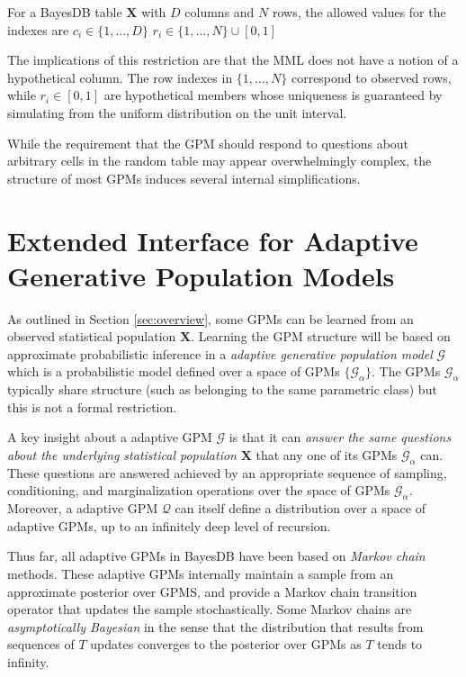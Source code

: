\documentclass[10pt,letterpaper]{article}
\newcommand{\set}[1]{\{#1\}}
\begin{document}
For a BayesDB table $\mathbf{X}$ with $D$ columns and $N$ rows, the allowed
values for the indexes are
    \subitem $c_i \in \set{1,\dots,D}$
    \subitem $r_i \in \set{1,\dots,N} \cup [0,1]$

The implications of this restriction are that the MML does not have a notion of
a hypothetical column. The row indexes in $\set{1,\dots,N}$ correspond to
observed rows, while $r_i \in [0,1]$ are hypothetical members whose uniqueness
is guaranteed by simulating from the uniform distribution on the unit interval.

While the requirement that the GPM should respond to questions about arbitrary
cells in the random table may appear overwhelmingly complex, the structure of
most GPMs induces several internal simplifications.

\section{Extended Interface for Adaptive Generative Population Models}
\label{sec:adaptive_gpm}

As outlined in Section \ref{sec:overview}, some GPMs can be learned from an
observed statistical population $\mathbf{X}$. Learning the GPM structure will be
based on approximate probabilistic inference in a \textit{adaptive generative
population model} $\mathcal{G}$ which is a probabilistic model defined over a
space of GPMs $\set{\mathcal{G_\alpha}}$. The GPMs $\mathcal{G}_\alpha$
typically share structure (such as belonging to the same parametric class) but
this is not a formal restriction.

A key insight about a adaptive GPM $\mathcal{G}$ is that it can \textit{answer
the same questions about the underlying statistical population} $\mathbf{X}$
that any one of its GPMs $\mathcal{G}_\alpha$ can. These questions are answered
achieved by an appropriate sequence of sampling, conditioning, and
marginalization operations over the space of GPMs $\mathcal{G}_\alpha$.
Moreover, a adaptive GPM $\mathcal{Q}$ can itself define a distribution over a
space of adaptive GPMs, up to an infinitely deep level of recursion.

Thus far, all adaptive GPMs in BayesDB have been based on \textit{Markov chain}
methods. These adaptive GPMs internally maintain a sample from an approximate
posterior over GPMS, and provide a Markov chain transition operator that updates
the sample stochastically. Some Markov chains are \textit{asymptotically
Bayesian} in the sense that the distribution that results from sequences of $T$
updates converges to the posterior over GPMs as $T$ tends to infinity.
\end{document}

